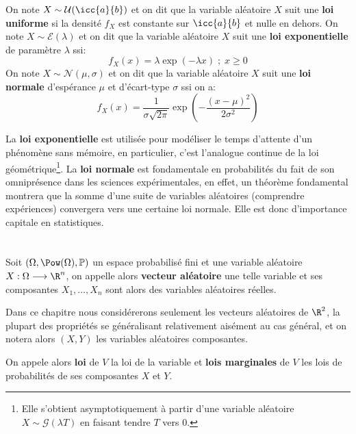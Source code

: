 \subsection*{}

On note \(X \sim \mathcal{U}(\icc{a}{b})\) et on dit que la variable aléatoire \(X\) suit une \textbf{loi uniforme} si la densité \(f_X\) est constante sur \(\icc{a}{b}\) et nulle en dehors.\+
On note \(X \sim \mathcal{E}(\lambda)\) et on dit que la variable aléatoire \(X\) suit une \textbf{loi exponentielle} de paramètre \(\lambda\) ssi:
\[
   f_X(x) = \lambda\exp{(-\lambda x)} \; ; \; x \geq 0  
\]
On note \(X \sim \mathcal{N}(\mu, \sigma)\) et on dit que la variable aléatoire \(X\) suit une \textbf{loi normale} d'espérance \(\mu\) et d'écart-type \(\sigma\) ssi on a:
\[
   f_X(x) = \frac{1}{\sigma\sqrt{2\pi}} \exp{\left(-\frac{(x - \mu)^2}{2\sigma^2}\right)}
\]


La \textbf{loi exponentielle} est utilisée pour modéliser le temps d'attente d'un phénomène sans mémoire, en particulier, c'est l'analogue continue de la loi géométrique\footnote[1]{Elle s'obtient asymptotiquement à partir d'une variable aléatoire \(X \sim \mathcal{G}(\lambda T)\) en faisant tendre \(T\) vers 0.}. \+
La \textbf{loi normale} est fondamentale en probabilités du fait de son omniprésence dans les sciences expérimentales, en effet, un théorème fondamental montrera que la somme d'une suite de variables aléatoires (comprendre expériences) convergera vers une certaine loi normale. Elle est donc d'importance capitale en statistiques.\+
\chapter*{} %

Soit \((\Omega, \Pow(\Omega), \mathbb{P})\) un espace probabilisé fini et une variable aléatoire \(X : \Omega \longrightarrow \R^n\), on appelle alors \textbf{vecteur aléatoire} une telle variable et ses composantes \(X_1, \ldots, X_n\) sont alors des variables aléatoires réelles.\< 

Dans ce chapitre nous considérerons seulement les vecteurs aléatoires de \(\R^2\), la plupart des propriétés se généralisant relativement aisément au cas général, et on notera alors \((X, Y)\) les variables aléatoires composantes.\<

On appele alors \textbf{loi} de \(V\) la loi de la variable et \textbf{lois marginales} de \(V\) les lois de probabilités de ses composantes \(X\) et \(Y\).

